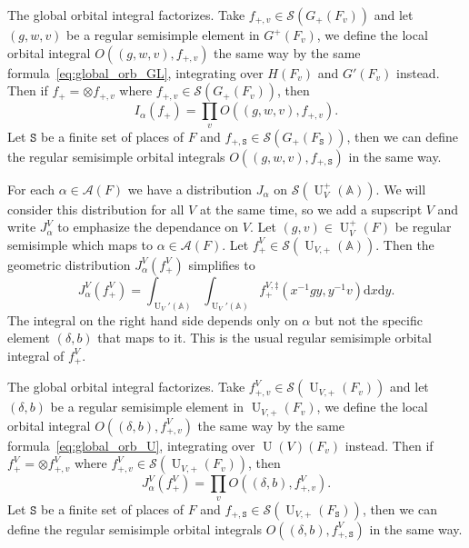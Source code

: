 \documentclass[letterpaper,11pt]{amsart}
\newcommand{\bA}{\mathbb{A}}
\newcommand{\cA}{\mathcal{A}}
\newcommand{\cS}{\mathcal{S}}
\newcommand{\rd}{\mathrm{d}}
\newcommand{\tS}{\mathtt{S}}
\newcommand{\<}{\negthickspace}
\DeclareMathOperator{\U}{U}
\theoremstyle{definition}
\theoremstyle{plain}
\theoremstyle{remark}
\numberwithin{equation}{section}
\begin{document}
The global orbital integral factorizes. Take $f_{+, v} \in \cS(G_+(F_v))$ and let
$(g, w, v)$ be a regular semisimple element in $G^+(F_v)$, we define the
local orbital integral $O((g, w, v), f_{+, v})$ the same way by the same
formula~\eqref{eq:global_orb_GL}, integrating over $H(F_v)$ and $G'(F_v)$
instead. Then if $f_+ = \otimes f_{+, v}$ where $f_{+, v} \in \cS(G_+(F_v))$,
then
    \[
    I_{\alpha}(f_+) = \prod_v O((g, w, v), f_{+, v}).
    \]
Let $\tS$ be a finite set of places of $F$ and $f_{+, \tS} \in
\cS(G_+(F_\tS))$, then we can define the regular semisimple orbital integrals
$O((g, w, v), f_{+, \tS})$ in the same way.


For each $\alpha \in \cA(F)$ we have a distribution $J_{\alpha}$ on
$\cS(\U_V^+(\bA))$. We will consider this distribution for all $V$ at the
same time, so we add a supscript $V$ and write $J_{\alpha}^V$ to emphasize
the dependance on $V$. Let $(g, v) \in \U_V^+(F)$ be regular semisimple
which maps to $\alpha \in \cA(F)$. Let $f^{V}_+ \in \cS(\U_{V, +}(\bA))$.
Then the geometric distribution $J^V_{\alpha}(f^V_+)$ simplifies to
    \begin{equation}    \label{eq:global_orb_U}
    J^V_{\alpha}(f^V_+) = \int_{\U_V'(\bA)} \int_{\U_V'(\bA)}
    f^{V,\ddag}_+ (x^{-1} g y, y^{-1} v) \rd x \rd y.
    \end{equation}
The integral on the right hand side depends only on $\alpha$ but not the
specific element $(\delta,b)$ that maps to it. This is the usual regular
semisimple orbital integral of $f^{V}_+$.

The global orbital integral factorizes. Take $f^V_{+, v} \in
\cS(\U_{V,+}(F_v))$ and let $(\delta, b)$ be a regular semisimple element in
$\U_{V,+}(F_v)$, we define the local orbital integral $O((\delta,b), f^V_{+,
v})$ the same way by the same formula~\eqref{eq:global_orb_U}, integrating
over $\U(V)(F_v)$ instead. Then if $f_+^V = \otimes f^V_{+, v}$ where
$f^V_{+, v} \in \cS(\U_{V, +}(F_v))$, then
    \[
    J^V_{\alpha}(f^V_+) = \prod_v O((\delta, b), f^V_{+, v}).
    \]
Let $\tS$ be a finite set of places of $F$ and $f_{+, \tS} \in \cS(\U_{V,
+}(F_\tS))$, then we can define the regular semisimple orbital integrals
$O((\delta, b), f^V_{+, \tS})$ in the same way.
\end{document}
